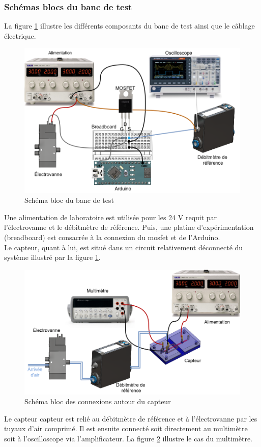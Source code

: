 \subsubsection{Schémas blocs du banc de test}
La figure \ref{fig:schema_cables} illustre les différents composants du banc de test ainsi que le câblage électrique.
\begin{figure}[H]
    \centering
    \includegraphics[scale = 0.35]{assets/figures/cablage_electrique.png}
    \caption{Schéma bloc du banc de test}
    \label{fig:schema_cables}
\end{figure}

Une alimentation de laboratoire est utilisée pour les 24 V requit par l'électrovanne et le débitmètre de référence. Puis, une platine d'expérimentation 
(breadboard) est consacrée à la connexion du \gls{mosfet} et de l'Arduino. \\

Le capteur, quant à lui, est situé dans un circuit relativement déconnecté du système illustré par la figure \ref{fig:schema_cables}. 
\begin{figure}[H]
    \centering
    \includegraphics[scale=0.35]{assets/figures/Raccord_air.png}
    \caption{Schéma bloc des connexions autour du capteur}
    \label{fig:circuit_capteur}
\end{figure}
Le capteur \gls{capteur} est relié au débitmètre de référence et à l'électrovanne par les tuyaux d'air comprimé. Il est ensuite connecté soit directement au 
multimètre soit à l'oscilloscope via l'amplificateur. La figure \ref{fig:circuit_capteur} illustre le cas du multimètre. \\

